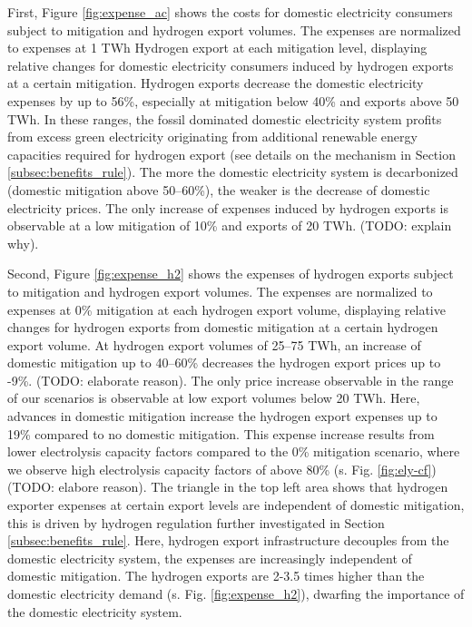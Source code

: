 First, Figure \ref{fig:expense_ac} shows the costs for domestic electricity consumers subject to mitigation and hydrogen export volumes. The expenses are normalized to expenses at 1 TWh Hydrogen export at each mitigation level, displaying relative changes for domestic electricity consumers induced by hydrogen exports at a certain mitigation.
Hydrogen exports decrease the domestic electricity expenses by up to 56\%, especially at mitigation below 40\% and exports above 50 TWh. In these ranges, the fossil dominated domestic electricity system profits from excess green electricity originating from additional renewable energy capacities required for hydrogen export (see details on the mechanism in Section \ref{subsec:benefits_rule}). The more the domestic electricity system is decarbonized (domestic mitigation above 50--60\%), the weaker is the decrease of domestic electricity prices.
The only increase of expenses induced by hydrogen exports is observable at a low mitigation of 10\% and exports of 20 TWh. (TODO: explain why).


Second, Figure \ref{fig:expense_h2} shows the expenses of hydrogen exports subject to mitigation and hydrogen export volumes. The expenses are normalized to expenses at 0\% mitigation at each hydrogen export volume, displaying relative changes for hydrogen exports from domestic mitigation at a certain hydrogen export volume.
At hydrogen export volumes of 25--75 TWh, an increase of domestic mitigation up to 40--60\% decreases the hydrogen export prices up to -9\%. (TODO: elaborate reason).
The only price increase observable in the range of our scenarios is observable at low export volumes below 20 TWh. Here, advances in domestic mitigation increase the hydrogen export expenses up to 19\% compared to no domestic mitigation.
This expense increase results from lower electrolysis capacity factors compared to the 0\% mitigation scenario, where we observe high electrolysis capacity factors of above 80\% (s. Fig. \ref{fig:ely-cf}) (TODO: elabore reason).
The triangle in the top left area shows that hydrogen exporter expenses at certain export levels are independent of domestic mitigation, this is driven by hydrogen regulation further investigated in Section \ref{subsec:benefits_rule}. Here, hydrogen export infrastructure decouples from the domestic electricity system, the expenses are increasingly independent of domestic mitigation. The hydrogen exports are 2-3.5 times higher than the domestic electricity demand (s. Fig. \ref{fig:expense_h2}), dwarfing the importance of the domestic electricity system.


